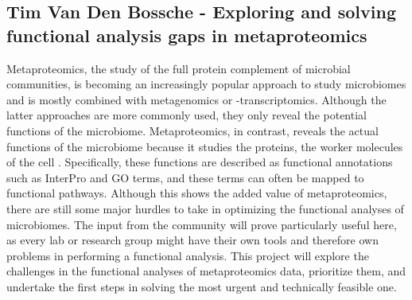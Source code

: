 \subsection{Tim Van Den Bossche - Exploring and solving functional analysis gaps in metaproteomics}

Metaproteomics, the study of the full protein complement of microbial communities, is becoming an increasingly popular approach to study microbiomes and is mostly combined with metagenomics or -transcriptomics. Although the latter approaches are more commonly used, they only reveal the potential functions of the microbiome. Metaproteomics, in contrast, reveals the actual functions of the microbiome because it studies the proteins, the worker molecules of the cell \citep{pmid32174200}. Specifically, these functions are described as functional annotations such as InterPro and GO terms, and these terms can often be mapped to functional pathways. Although this shows the added value of metaproteomics, there are still some major hurdles to take in optimizing the functional analyses of microbiomes. The input from the community will prove particularly useful here, as every lab or research group might have their own tools and therefore own problems in performing a functional analysis. This project will explore the challenges in the functional analyses of metaproteomics data, prioritize them, and undertake the first steps in solving the most urgent and technically feasible one. 

